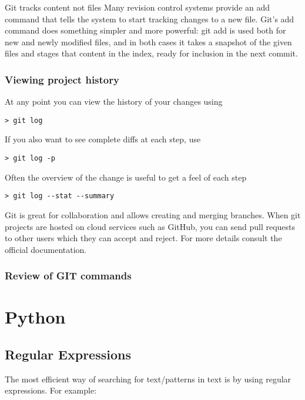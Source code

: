 \documentclass[justified,sixbynine]{tufte-book}
\theoremstyle{plain}%
\theoremstyle{definition}
\theoremstyle{remark}
\begin{document}
\begin{fullwidth}
Git tracks content not files
Many revision control systems provide an add command that tells the system to start tracking changes to a new file. Git's add command does something simpler and more powerful: git add is used both for new and newly modified files, and in both cases it takes a snapshot of the given files and stages that content in the index, ready for inclusion in the next commit.

\subsection{Viewing project history}
At any point you can view the history of your changes using

\begin{lstlisting}
> git log
\end{lstlisting}
If you also want to see complete diffs at each step, use

\begin{lstlisting}
> git log -p
\end{lstlisting}

Often the overview of the change is useful to get a feel of each step

\begin{lstlisting}
> git log --stat --summary
\end{lstlisting}

Git is great for collaboration and allows creating and merging branches. When git projects are hosted on cloud services such as GitHub, you can send pull requests to other users which they can accept and reject. For more details consult the official documentation.

\subsection{Review of GIT commands}

\goodbreak\chapter{Python}



\section{Regular Expressions}

The most efficient way of searching for text/patterns in text is by using regular expressions. For example:


\end{fullwidth}
\end{document}
